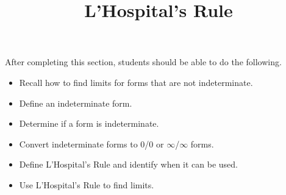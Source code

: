\documentclass{ximera}
\title{L'Hospital's Rule}
\begin{document}
\begin{abstract}
\end{abstract}

\maketitle

\begin{sectionOutcomes}

After completing this section, students should be able to do the following.

\begin{itemize}
	\item Recall how to find limits for forms that are not indeterminate.
	\item Define an indeterminate form.
	\item Determine if a form is indeterminate.
	\item Convert indeterminate forms to 0/0 or $\infty$/$\infty$ forms.
	\item Define L'Hospital's Rule and identify when it can be used.
	\item Use L'Hospital's Rule to find limits.
\end{itemize}

\end{sectionOutcomes}
\end{document}
